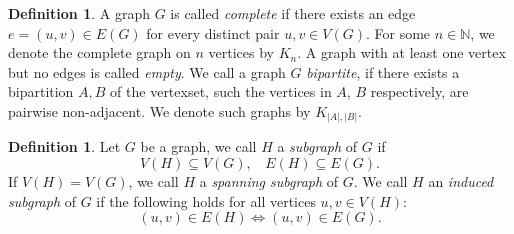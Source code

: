 \documentclass[12pt,a4paper, twoside, autooneside=false]{scrartcl}
\theoremstyle{definition}
\newtheorem{definition}[theorem]{Definition}
\theoremstyle{remark}
\numberwithin{equation}{section}
\begin{document}
\begin{definition}
A graph $G$ is called \textit{complete} if there exists an edge $e = (u,v) \in E(G)$ for every distinct pair $u,v \in V(G)$. For some $n \in \mathbb{N}$, we denote the complete graph on $n$ vertices by $K_n$. A graph with at least one vertex but no edges is called \textit{empty}. We call a graph $G$ \textit{bipartite}, if there exists a bipartition $A,B$ of the vertexset, such the vertices in $A$, $B$ respectively,  are pairwise non-adjacent. We denote such graphs by $K_{|A|,|B|}$.
\end{definition}
\begin{definition}
Let $G$ be a graph, we call $H$ a \textit{subgraph} of $G$ if 
\[
V(H) \subseteq V(G), \ \ \ \ E(H) \subseteq E(G).
\]
If $V(H) = V(G)$, we call $H$ a \textit{spanning subgraph} of $G$. We call $H$ an \textit{induced subgraph} of $G$ if the following holds for all vertices $u,v \in V(H)$: 
\[
(u,v) \in E(H) \Longleftrightarrow (u,v) \in E(G).
\]
\end{definition}
\end{document}
